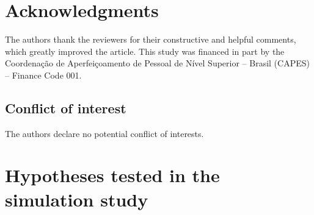 \documentclass[AMA,STIX1COL]{WileyNJD-v2}
\begin{document}


\section*{Acknowledgments}

The authors thank the reviewers for their constructive and helpful comments, which greatly improved the article. This study was financed in part by the Coordenação de Aperfeiçoamento de Pessoal de Nível Superior – Brasil (CAPES) – Finance Code 001.


\subsection*{Conflict of interest}

The authors declare no potential conflict of interests.






%

\clearpage


\appendix

\section{Hypotheses tested in the simulation study\label{app1}}

\end{document}
